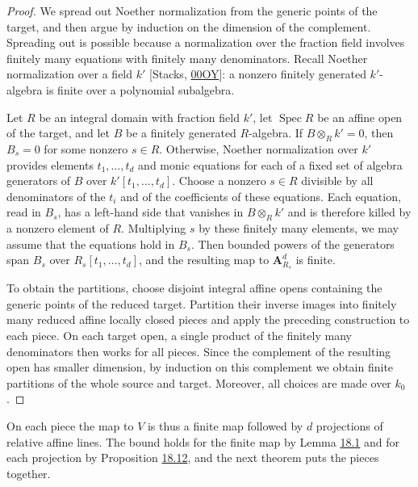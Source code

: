 \documentclass[11pt]{article}
\begin{document}
\begin{proof}[{Proof}]\label{bp43}%
We spread out Noether normalization from the generic points of the target, and then argue by induction on the dimension of the complement. Spreading out is possible because a normalization over the fraction field involves finitely many equations with finitely many denominators. Recall Noether normalization over a field \(k'\) [Stacks, \href{https://stacks.math.columbia.edu/tag/00OY}{00OY}]: a nonzero finitely generated \(k'\)-algebra is finite over a polynomial subalgebra.

Let \(R\) be an integral domain with fraction field \(k'\), let \(\operatorname{Spec}R\) be an affine open of the target, and let \(B\) be a finitely generated \(R\)-algebra. If \(B\otimes_Rk'=0\), then \(B_s=0\) for some nonzero \(s\in R\). Otherwise, Noether normalization over \(k'\) provides elements \(t_1,\ldots,t_d\) and monic equations for each of a fixed set of algebra generators of \(B\) over \(k'[t_1,\ldots,t_d]\). Choose a nonzero \(s\in R\) divisible by all denominators of the \(t_i\) and of the coefficients of these equations. Each equation, read in \(B_s\), has a left-hand side that vanishes in \(B\otimes_Rk'\) and is therefore killed by a nonzero element of \(R\). Multiplying \(s\) by these finitely many elements, we may assume that the equations hold in \(B_s\). Then bounded powers of the generators span \(B_s\) over \(R_s[t_1,\ldots,t_d]\), and the resulting map to \(\mathbf A^d_{R_s}\) is finite.

To obtain the partitions, choose disjoint integral affine opens containing the generic points of the reduced target. Partition their inverse images into finitely many reduced affine locally closed pieces and apply the preceding construction to each piece. On each target open, a single product of the finitely many denominators then works for all pieces. Since the complement of the resulting open has smaller dimension, by induction on this complement we obtain finite partitions of the whole source and target. Moreover, all choices are made over \(k_0\).
\end{proof}

\label{bp44}%
On each piece the map to \(V\) is thus a finite map followed by \(d\) projections of relative affine lines. The bound holds for the finite map by Lemma \hyperref[bp5]{18.1} and for each projection by Proposition \hyperref[bp38]{18.12}, and the next theorem puts the pieces together.
\end{document}
